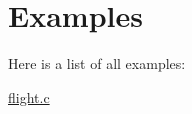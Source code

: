 \section{Examples}
Here is a list of all examples\-:\begin{DoxyCompactItemize}
\item 
\hyperlink{flight_8c-example}{flight.\-c}
\end{DoxyCompactItemize}

